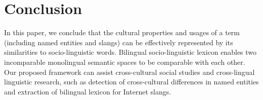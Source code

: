 \section{Conclusion}
In this paper, we conclude that the cultural properties and usages of a term (including named entities and slangs) can be effectively represented by its similarities to socio-linguistic words. 
Bilingual socio-linguistic lexicon enables two incomparable monolingual semantic spaces to be comparable with each other. 
Our proposed framework can assist cross-cultural social studies and cross-lingual linguistic research, such as detection of cross-cultural differences in named entities and extraction of bilingual lexicon for Internet slangs.
